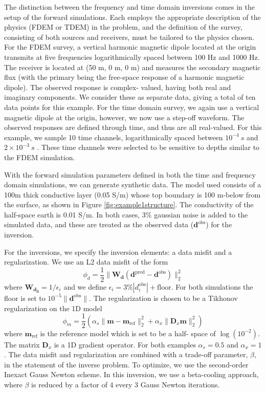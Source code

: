 \documentclass[preprint,review,3p,times,onecolumn,authoryear]{elsarticle}
\begin{document}
The distinction between the frequency and time domain inversions
comes in the setup of the forward simulations. Each employs the appropriate
description of the physics (FDEM or TDEM) in the problem, and the definition
of the survey, consisting of both sources and receivers, must be tailored to
the physics chosen. For the FDEM survey, a vertical harmonic magnetic dipole
located at the origin transmits at five frequencies logarithmically spaced
between 100 Hz and 1000 Hz. The receiver is located at (50 m, 0 m, 0 m)
and measures the secondary magnetic flux (with the primary being the free-space
response of a harmonic magnetic dipole). The observed response is complex-
valued, having both real and imaginary components. We consider these as
separate data, giving a total of ten data points for this example. For the
time domain survey, we again use a vertical magnetic dipole at the origin,
however, we now use a step-off waveform. The observed responses are defined
through time, and thus are all real-valued. For this example, we sample 10
time channels, logarithmically spaced between $10^{-4} ~s$ and $2\times10^{-3}
~ s$ . These time channels were selected to be sensitive to depths similar to
the FDEM simulation.

With the forward simulation parameters defined in both the time and frequency
domain simulations, we can generate synthetic data. The model used consists of
a 100m thick conductive layer (0.05 S/m) whose top boundary is 100 m-below
from the surface, as shown in Figure \ref{fig:example1structure}. The
conductivity of the half-space earth is 0.01 S/m. In both cases, 3\% gaussian
noise is added to the simulated data, and these are treated as the observed
data ($\mathbf{d}^{\text{obs}}$) for the inversion.

For the inversions, we specify the inversion elements: a data misfit and a
regularization. We use an L2 data misfit of the form
\begin{equation}
    \phi_d = \frac{1}{2}\|\mathbf{W_d}(\mathbf{d}^{\text{pred}} - \mathbf{d}^{\text{obs}})\|_2^2
    \label{eq:datamisfit}
\end{equation}
where $\mathbf{W_{d_{ii}}} = 1/\epsilon_i$ and we define $\epsilon_i = 3\% |d^{\text{obs}}_i| + \text{floor}$. For both simulations the floor is set to $10^{-5}\| \mathbf{d}^\text{obs}\|$. The regularization is chosen to be a Tikhonov regularization on the 1D model
\begin{equation}
    \phi_m = \frac{1}{2}\left(\alpha_s\|\mathbf{m}- \mathbf{m}_{\text{ref}} \|_2^2 + \alpha_x\| \mathbf{D}_x \mathbf{m}\|_2^2\right)
\end{equation}
where $\mathbf{m}_{\text{ref}}$ is the reference model which is set to be a half-
space of $\log(10^{-2})$. The matrix $\mathbf{D}_x$ is a 1D gradient
operator. For both examples $\alpha_s = 0.5$ and $\alpha_x = 1$. The data
misfit and regularization are combined with a trade-off parameter, $\beta$, in
the statement of the inverse problem. To optimize, we use the second-order
Inexact Gauss Newton scheme. In this inversion, we use a beta-cooling
approach, where $\beta$ is reduced by a factor of 4 every 3 Gauss Newton
iterations.
\end{document}
